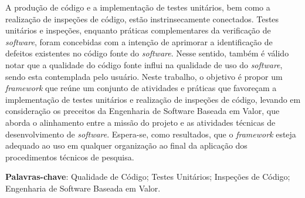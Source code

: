 \begin{resumo}
 
 A produção de código e a implementação de testes unitários, bem como a realização de inspeções de código, estão instrinsecamente conectados. Testes unitários e inspeções, enquanto práticas complementares da verificação de \textit{software}, foram concebidas com a intenção de aprimorar a identificação de defeitos existentes no código fonte do \textit{software}. Nesse sentido, também é válido notar que a qualidade do código fonte influi na qualidade de uso do \textit{software}, sendo esta contemplada pelo usuário. Neste trabalho, o objetivo é propor um \textit{framework} que reúne um conjunto de atividades e práticas que favoreçam a implementação de testes unitários e realização de inspeções de código, levando em consideração os preceitos da Engenharia de Software Baseada em Valor, que aborda o alinhamento entre a missão do projeto e as atividades técnicas de desenvolvimento de \textit{software}. Espera-se, como resultados, que o \textit{framework} esteja adequado ao uso em qualquer organização ao final da aplicação dos procedimentos técnicos de pesquisa.

 \vspace{\onelineskip}
    
 \noindent
 \textbf{Palavras-chave}: Qualidade de Código; Testes Unitários; Inspeções de Código; Engenharia de Software Baseada em Valor.
\end{resumo}
